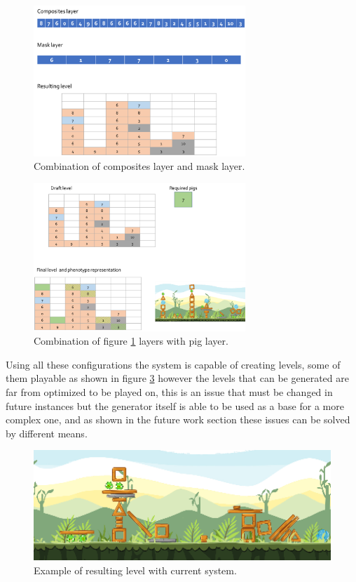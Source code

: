 \documentclass[conference]{IEEEtran}
\begin{document}
    \begin{figure}[htbp]
        \centerline{\includegraphics[width=80mm]{Images/layer12_combine.png}}
        \caption{Combination of composites layer and mask layer.}
        \label{layer12_combine}
    \end{figure}
    
    \begin{figure}[htbp]
        \centerline{\includegraphics[width=80mm]{Images/layer123_combine.png}}
        \caption{Combination of figure \ref{layer12_combine} layers with pig layer.}
        \label{layer123_combine}
    \end{figure}
    
    Using all these configurations the system is capable of creating levels, some of
    them playable as shown in figure \ref{result_1} however the levels that can be
    generated are far from optimized to be played on, this is an issue that must be
    changed in future instances but the generator itself is able to be used as a
    base for a more complex one, and as shown in the future work section these issues
    can be solved by different means.
    
    \begin{figure}[htbp]
        \centerline{\includegraphics[width=160mm]{Images/Result_n2.png}}
        \caption{Example of resulting level with current system.}
        \label{result_1}
    \end{figure}
\end{document}
